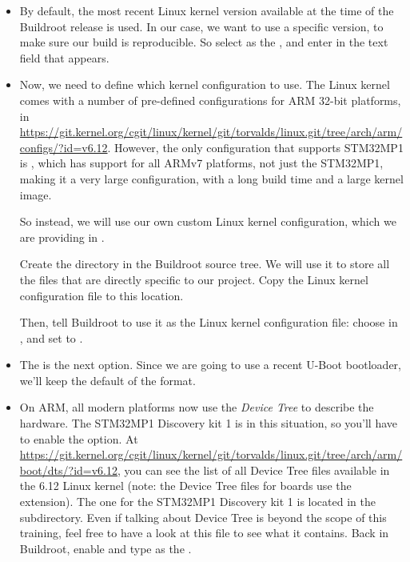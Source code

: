 \begin{itemize}
\begin{itemize}
  \item By default, the most recent Linux kernel version available at
    the time of the Buildroot release is used. In our case, we want to
    use a specific version, to make sure our build is reproducible. So
    select  as the , and
    enter  in the  text field that
    appears.

  \item Now, we need to define which kernel configuration to use. The
    Linux kernel comes with a number of pre-defined configurations for
    ARM 32-bit platforms, in
    \url{https://git.kernel.org/cgit/linux/kernel/git/torvalds/linux.git/tree/arch/arm/configs/?id=v6.12}. However,
    the only configuration that supports STM32MP1 is
    , which has support for all ARMv7
    platforms, not just the STM32MP1, making it a very large
    configuration, with a long build time and a large kernel image.

    So instead, we will use our own custom Linux kernel configuration,
    which we are providing in
    .

    Create the directory  in the Buildroot
    source tree. We will use it to store all the files that are
    directly specific to our project. Copy the Linux kernel
    configuration file to this location.

    Then, tell Buildroot to use it as the Linux kernel configuration
    file: choose  in , and set  to
    .

  \item The  is the next option. Since we
    are going to use a recent U-Boot bootloader, we'll keep the
    default of the  format.

  \item On ARM, all modern platforms now use the {\em Device Tree} to
    describe the hardware. The STM32MP1 Discovery kit 1 is in this
    situation, so you'll have to enable the 
    option. At \url{https://git.kernel.org/cgit/linux/kernel/git/torvalds/linux.git/tree/arch/arm/boot/dts/?id=v6.12},
    you can see the list of all Device Tree files available in the
    6.12 Linux kernel (note: the Device Tree files for boards use
    the  extension). The one for the STM32MP1 Discovery kit
    1 is  located in the 
    subdirectory. Even if talking about Device Tree is beyond the
    scope of this training, feel free to have a look at this file to
    see what it contains. Back in Buildroot, enable  and type  as
    the .


\end{itemize}
\end{itemize}
